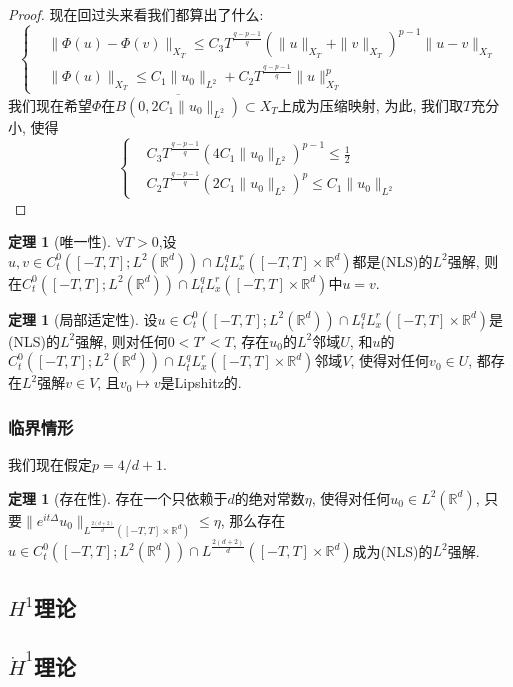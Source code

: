 \documentclass{ctexbook}
\theoremstyle{definition}
\newtheorem{theorem}[definition]{定理}
\theoremstyle{remark}
\newcommand{\ovl}{\overline}
\begin{document}
\begin{proof}
现在回过头来看我们都算出了什么: 
$$\left\{
\begin{aligned}
&\|\Phi(u)-\Phi(v)\|_{X_T}\le C_3T^{\frac{q-p-1}{q}}\left(\|u\|_{X_T}+\|v\|_{X_T}\right)^{p-1}\|u-v\|_{X_T}\\
&\|\Phi(u)\|_{X_T}\le C_1\|u_0\|_{L^2}+C_2T^{\frac{q-p-1}{q}}\|u\|_{X_T}^p
\end{aligned}
\right.$$
我们现在希望$\Phi$在$\ovl{B(0,2C_1\|u_0\|_{L^2})}\subset X_T$上成为压缩映射, 为此, 我们取$T$充分小, 使得
$$\left\{
\begin{aligned}
&C_3T^{\frac{q-p-1}{q}}(4C_1\|u_0\|_{L^2})^{p-1}\le\frac{1}{2}\\
&C_2T^{\frac{q-p-1}{q}}(2C_1\|u_0\|_{L^2})^p\le C_1\|u_0\|_{L^2}
\end{aligned}
\right.$$
\end{proof}

\begin{theorem}[唯一性]
$\forall T>0$,设$u,v\in C_t^0([-T,T];L^2(\mathbb{R}^d))\cap L_t^qL_x^r([-T,T]\times\mathbb{R}^d)$都是(NLS)的$L^2$强解, 则在$C_t^0([-T,T];L^2(\mathbb{R}^d))\cap L_t^qL_x^r([-T,T]\times\mathbb{R}^d)$中$u=v$. 
\end{theorem}

\begin{theorem}[局部适定性]
设$u\in C_t^0([-T,T];L^2(\mathbb{R}^d))\cap L_t^qL_x^r([-T,T]\times\mathbb{R}^d)$是(NLS)的$L^2$强解, 则对任何$0<T'<T$, 存在$u_0$的$L^2$邻域$U$, 和$u$的$C_t^0([-T,T];L^2(\mathbb{R}^d))\cap L_t^qL_x^r([-T,T]\times\mathbb{R}^d)$邻域$V$, 使得对任何$v_0\in U$, 都存在$L^2$强解$v\in V$, 且$v_0\mapsto v$是Lipshitz的. 
\end{theorem}

\subsubsection{临界情形}
我们现在假定$p=4/d+1$. 

\begin{theorem}[存在性]
存在一个只依赖于$d$的绝对常数$\eta$, 使得对任何$u_0\in L^2(\mathbb{R}^d)$, 只要$\|e^{it\Delta}u_0\|_{L^{\frac{2(d+2)}{d}}([-T,T]\times\mathbb{R}^d)}\le\eta$, 那么存在$u\in C_t^0([-T,T];L^2(\mathbb{R}^d))\cap L^{\frac{2(d+2)}{d}}([-T,T]\times\mathbb{R}^d)$成为(NLS)的$L^2$强解. 
\end{theorem}
\subsection{$H^1$理论}
\subsection{$\dot{H}^1$理论}
\end{document}

